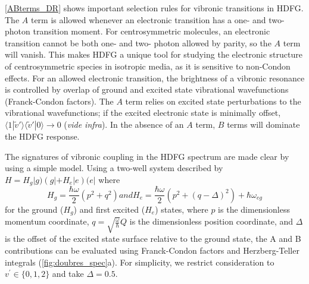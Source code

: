 \documentclass[aip, jcp, reprint, onecolumn, nofootinbib]{revtex4-2}
\begin{document}
\autoref{ABterms_DR} shows important selection rules for vibronic transitions in HDFG.
The $A$ term is allowed whenever an electronic transition has a one- and two- photon transition moment.
For centrosymmetric molecules, an electronic transition cannot be both one- and two- photon allowed by parity, so the $A$ term will vanish.
This makes HDFG a unique tool for studying the electronic structure of centrosymmetric species in isotropic media, as it is sensitive to non-Condon effects.\cite{Milojevich2011, Olson2018}
For an allowed electronic transition, the brightness of a vibronic resonance is controlled by overlap of ground and excited state vibrational wavefunctions (Franck-Condon factors).
The $A$ term relies on excited state perturbations to the vibrational wavefunctions; if the excited electronic state is minimally offset, $\langle 1 | \tilde{v}' \rangle \langle \tilde{v}' | 0 \rangle \rightarrow 0$ (\textit{vide infra}).
In the absence of an $A$ term, $B$ terms will dominate the HDFG response.

The signatures of vibronic coupling in the HDFG spectrum are made clear by using a simple model.
Using a two-well system described by $H = H_g |g) \left(g| + H_e |e\right) (e|$ where
\begin{subequations}\label{Hamiltonian}
	\begin{equation}
		H_g = \frac{\hbar \omega }{2} \left(p^2 + q^2 \right)
	\end{equation}
	and
	\begin{equation}
		H_e = \frac{\hbar \omega }{2} \left(p^2 +  (q-\Delta)^2 \right) + \hbar \omega_{eg}
	\end{equation}
\end{subequations}
for the ground ($H_g$) and first excited ($H_e$) states, where $p$ is the dimensionless momentum coordinate, $q = \sqrt{\frac{\omega}{\hbar}} Q$ is the dimensionless position coordinate, and $\Delta$ is the offset of the excited state surface relative to the ground state, the A and B contributions can be evaluated using Franck-Condon factors and Herzberg-Teller integrals (\autoref{fig:doubres_spec}a).
For simplicity, we restrict consideration to $v^\prime \in \{0,1,2\}$ and take $\Delta = 0.5$.
\end{document}
